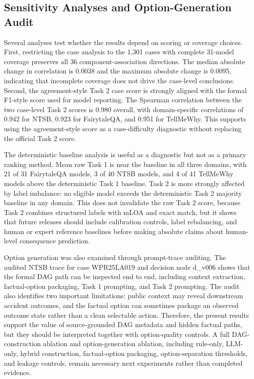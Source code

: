 \documentclass[pdflatex,sn-mathphys-num]{sn-jnl}%
\theoremstyle{thmstyleone}%
\theoremstyle{thmstyletwo}%
\theoremstyle{thmstylethree}%
\begin{document}
\subsection{Sensitivity Analyses and Option-Generation Audit}
Several analyses test whether the results depend on scoring or coverage choices. First, restricting the case analysis to the 1,301 cases with complete 31-model coverage preserves all 36 component-association directions. The median absolute change in correlation is 0.0038 and the maximum absolute change is 0.0095, indicating that incomplete coverage does not drive the case-level conclusions. Second, the agreement-style Task 2 case score is strongly aligned with the formal F1-style score used for model reporting. The Spearman correlation between the two case-level Task 2 scores is 0.980 overall, with domain-specific correlations of 0.942 for NTSB, 0.923 for FairytaleQA, and 0.951 for TellMeWhy. This supports using the agreement-style score as a case-difficulty diagnostic without replacing the official Task 2 score.

The deterministic baseline analysis is useful as a diagnostic but not as a primary ranking method. Mean raw Task 1 is near the baseline in all three domains, with 21 of 31 FairytaleQA models, 3 of 40 NTSB models, and 4 of 41 TellMeWhy models above the deterministic Task 1 baseline. Task 2 is more strongly affected by label imbalance: no eligible model exceeds the deterministic Task 2 majority baseline in any domain. This does not invalidate the raw Task 2 score, because Task 2 combines structured labels with mLOA and exact match, but it shows that future releases should include calibration controls, label rebalancing, and human or expert reference baselines before making absolute claims about human-level consequence prediction.

Option generation was also examined through prompt-trace auditing. The audited NTSB trace for case WPR25LA019 and decision node d\_v006 shows that the formal DAG path can be inspected end to end, including context extraction, factual-option packaging, Task 1 prompting, and Task 2 prompting. The audit also identifies two important limitations: public context may reveal downstream accident outcomes, and the factual option can sometimes package an observed outcome state rather than a clean selectable action. Therefore, the present results support the value of source-grounded DAG metadata and hidden factual paths, but they should be interpreted together with option-quality controls. A full DAG-construction ablation and option-generation ablation, including rule-only, LLM-only, hybrid construction, factual-option packaging, option-separation thresholds, and leakage controls, remain necessary next experiments rather than completed evidence.
\end{document}

